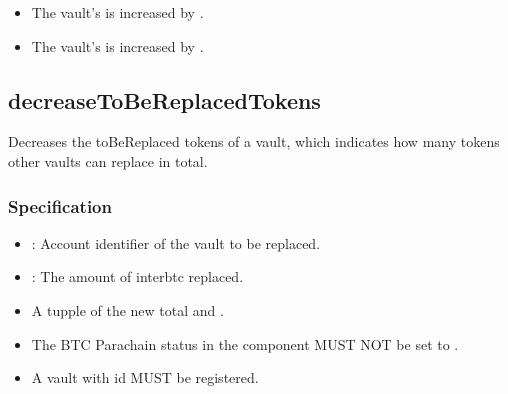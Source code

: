 \documentclass[a4paper,10pt,english]{sphinxmanual}
\begin{document}
\begin{itemize}
\item {} 
The vault’s  is increased by .

\item {} 
The vault’s  is increased by .

\end{itemize}


\subsection{decreaseToBeReplacedTokens}
\label{\detokenize{spec/vault-registry:decreasetobereplacedtokens}}\label{\detokenize{spec/vault-registry:id31}}
Decreases the toBeReplaced tokens of a vault, which indicates how many tokens other vaults can replace in total.


\subsubsection{Specification}
\label{\detokenize{spec/vault-registry:id32}}


\begin{itemize}
\item {} 
: Account identifier of the vault to be replaced.

\item {} 
: The amount of interbtc replaced.

\end{itemize}

\begin{itemize}
\item {} 
A tupple of the new total  and .

\end{itemize}

\begin{itemize}
\item {} 
The BTC Parachain status in the {\hyperref[\detokenize{spec/security:security}]{}} component MUST NOT be set to .

\item {} 
A vault with id  MUST be registered.

\end{itemize}
\end{document}
